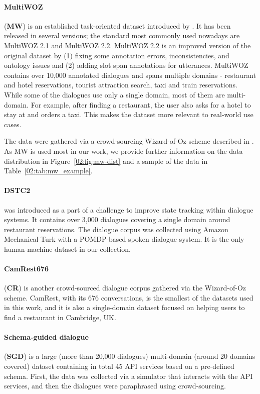 \paragraph{MultiWOZ} (\textbf{MW}) is an established task-oriented dataset introduced by \cite{budzianowski-etal-2018-multiwoz}.
It has been released in several versions; the standard most commonly used nowadays are MultiWOZ 2.1 and MultiWOZ 2.2.
MultiWOZ 2.2 is an improved version of the original dataset by (1) fixing some annotation errors, inconsistencies, and ontology issues and (2) adding slot span annotations for utterances.
MultiWOZ contains over 10,000 annotated dialogues and spans multiple domains - restaurant and hotel reservations, tourist attraction search, taxi and train reservations.
While some of the dialogues use only a single domain, most of them are multi-domain.
For example, after finding a restaurant, the user also asks for a hotel to stay at and orders a taxi.
This makes the dataset more relevant to real-world use cases.

The data were gathered via a crowd-sourcing Wizard-of-Oz scheme described in \cite{wen-etal-2017-wizard-of-oz}.
As MW is used most in our work, we provide further information on the data distribution in Figure~\ref{02:fig:mw-dist} and a sample of the data in Table~\ref{02:tab:mw_example}.

\paragraph{DSTC2} \cite{henderson_robust_2014} was introduced as a part of a challenge to improve state tracking within dialogue systems. It contains over 3,000 dialogues covering a single domain around restaurant reservations. The dialogue corpus was collected using Amazon Mechanical Turk with a POMDP-based spoken dialogue system. It is the only human-machine dataset in our collection.

\paragraph{CamRest676} (\textbf{CR}) \cite{wen2016network} is another crowd-sourced dialogue corpus gathered via the Wizard-of-Oz scheme. CamRest, with its 676 conversations, is the smallest of the datasets used in this work, and it is also a single-domain dataset focused on helping users to find a restaurant in Cambridge, UK. 

\paragraph{Schema-guided dialogue} (\textbf{SGD}) is a large (more than 20,000 dialogues) multi-domain (around 20 domains covered) dataset containing in total 45 API services based on a pre-defined schema. First, the data was collected via a simulator that interacts with the API services, and then the dialogues were paraphrased using crowd-sourcing. \\

